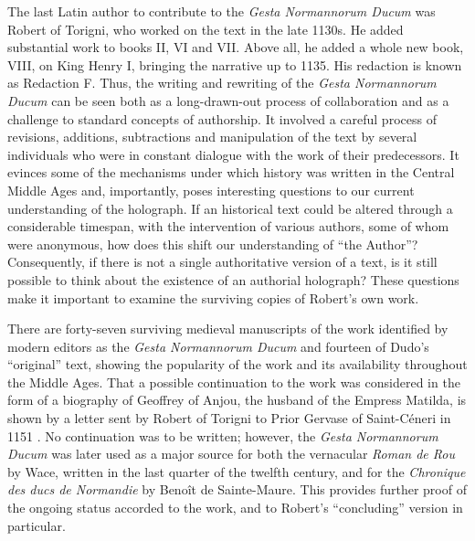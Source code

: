 \documentclass{article}
\begin{document}
The last Latin author to contribute to the \emph{Gesta Normannorum
Ducum} was Robert of Torigni, who worked on the text in the late 1130s.
He added substantial work to books II, VI and VII. Above all, he added a
whole new book, VIII, on King Henry I, bringing the narrative up to
1135. His redaction is known as Redaction F. Thus, the writing and
rewriting of the \emph{Gesta Normannorum Ducum} can be seen both as a
long-drawn-out process of collaboration and as a challenge to standard
concepts of authorship. It involved a careful process of revisions,
additions, subtractions and manipulation of the text by several
individuals who were in constant dialogue with the work of their
predecessors. It evinces some of the mechanisms under which history was
written in the Central Middle Ages and, importantly, poses interesting
questions to our current understanding of the holograph. If an
historical text could be altered through a considerable timespan, with
the intervention of various authors, some of whom were anonymous, how
does this shift our understanding of ``the Author''? Consequently, if
there is not a single authoritative version of a text, is it still
possible to think about the existence of an authorial holograph? These
questions make it important to examine the surviving copies of Robert's
own work.

There are forty-seven surviving medieval manuscripts of the work
identified by modern editors as the \emph{Gesta Normannorum Ducum} and
fourteen of Dudo's ``original'' text, showing the popularity of the work
and its availability throughout the Middle Ages. That a possible
continuation to the work was considered in the form of a biography of
Geoffrey of Anjou, the husband of the Empress Matilda, is shown by a
letter sent by Robert of Torigni to Prior Gervase of Saint-Céneri in
1151 \citep[132]{van_houts_writing_2018}. No continuation was to be written; however,
the \emph{Gesta Normannorum Ducum} was later used as a major source for
both the vernacular \emph{Roman de Rou} by Wace, written in the last
quarter of the twelfth century, and for the \emph{Chronique des ducs de
Normandie} by Benoît de Sainte-Maure. This provides further proof of the
ongoing status accorded to the work, and to Robert's ``concluding''
version in particular.
\end{document}
